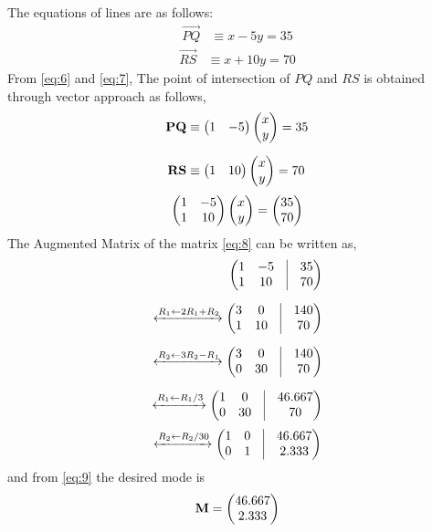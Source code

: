 \documentclass[journal,12pt,twocolumn]{IEEEtran}
\begin{document}
\begin{flushleft}
\begin{enumerate}
The equations of lines are as follows:
	\begin{align}
		\vec{PQ} &\equiv x - 5y = 35
		\label{eq:6}
	\end{align}
	\begin{align}
		\vec{RS} &\equiv x + 10y = 70 
		\label{eq:7}	
	\end{align}
%
From \eqref{eq:6} and \eqref{eq:7}, The point of intersection of $PQ$ and $RS$ is obtained through vector approach as follows,\\
	\begin{align*}
		\mathbf{PQ} &\equiv \begin{pmatrix}1 & -5\end{pmatrix}\begin{pmatrix}x\\y\end{pmatrix}=35\\[6pt]
		\mathbf{RS} &\equiv \begin{pmatrix}1 & 10\end{pmatrix}\begin{pmatrix}x\\y\end{pmatrix}=70
	\end{align*}
%
	\begin{align}
		\begin{pmatrix}1 & -5 \\ 1 & 10\end{pmatrix}\begin{pmatrix}x\\y\end{pmatrix}=\begin{pmatrix}35\\70\end{pmatrix}
		\label{eq:8}	
	\end{align}
%
The Augmented Matrix of the matrix \eqref{eq:8} can be written as,
	\begin{align*}
		\myvec{ 1 & -5 & \vrule & 35 \\
				1 & 10 & \vrule & 70} \\[6pt]
%		
		\xleftrightarrow[]{R_1 \leftarrow 2R_1+R_2}
			\myvec{ 3 & 0 & \vrule & 140 \\
					1 & 10 & \vrule & 70} \\[6pt]
%
		\xleftrightarrow[]{R_2 \leftarrow 3R_2-R_1}
			\myvec{ 3 & 0 & \vrule & 140 \\
					0 & 30 & \vrule & 70} \\[6pt]
%
		\xleftrightarrow[]{R_1 \leftarrow R_1/3}
			\myvec{ 1 & 0 & \vrule & 46.667 \\
					0 & 30 & \vrule & 70} 
	\end{align*}
	\begin{align}
		\xleftrightarrow[]{R_2 \leftarrow R_2/30}
			\myvec{ 1 & 0 & \vrule & 46.667 \\
					0 & 1 & \vrule & 2.333} 
			\label{eq:9}
	\end{align}
and from \eqref{eq:9} the desired mode is
	\begin{align*}
		\mathbf{M} = \begin{pmatrix}46.667 \\ 2.333\end{pmatrix}
	\end{align*}


\end{enumerate}
\end{flushleft}
\end{document}
